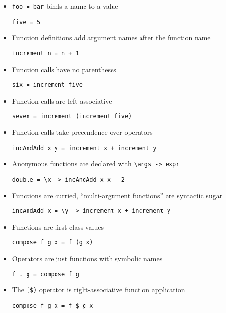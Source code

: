 \begin{itemize}
\item \verb|foo = bar| binds a name to a value
\begin{verbatim}
five = 5
\end{verbatim}

\item Function definitions add argument names after the function name
\begin{verbatim}
increment n = n + 1
\end{verbatim}

\item Function calls have no parentheses
\begin{verbatim}
six = increment five
\end{verbatim}

\item Function calls are left associative
\begin{verbatim}
seven = increment (increment five)
\end{verbatim}

\item Function calls take precendence over operators
\begin{verbatim}
incAndAdd x y = increment x + increment y
\end{verbatim}

\item Anonymous functions are declared with \verb|\args -> expr|
\begin{verbatim}
double = \x -> incAndAdd x x - 2
\end{verbatim}

\item Functions are curried, ``multi-argument functions'' are
  syntactic sugar
\begin{verbatim}
incAndAdd x = \y -> increment x + increment y
\end{verbatim}

\item Functions are first-class values
\begin{verbatim}
compose f g x = f (g x)
\end{verbatim}

\item Operators are just functions with symbolic names
\begin{verbatim}
f . g = compose f g
\end{verbatim}

\pagebreak
\item The \verb|($)| operator is right-associative function application
\begin{verbatim}
compose f g x = f $ g x
\end{verbatim}


\end{itemize}

